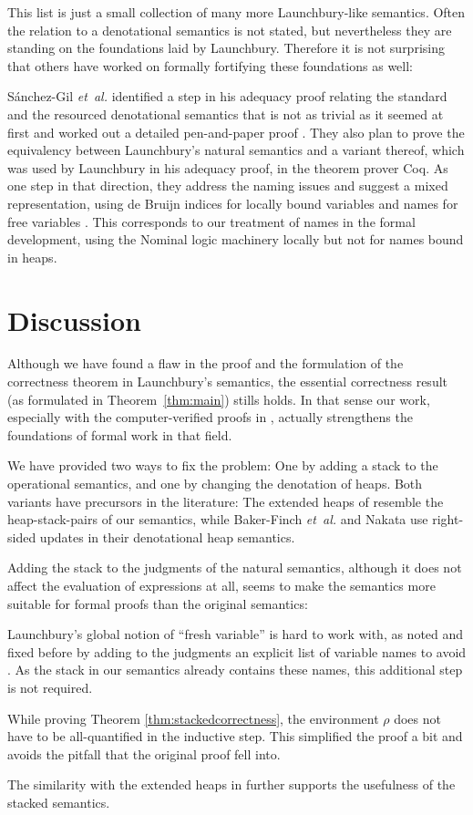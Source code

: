 \documentclass{jfp1}
\theoremstyle{nonumberbreak}
\begin{document}
This list is just a small collection of many more Launchbury-like semantics. Often the relation to a denotational semantics is not stated, but nevertheless they are standing on the foundations laid by Launchbury. Therefore it is not surprising that others have worked on formally fortifying these foundations as well:

S{\'a}nchez-Gil {\em et~al.} identified a step in his adequacy proof relating the standard and the resourced denotational semantics that is not as trivial as it seemed at first and worked out a detailed pen-and-paper proof . They also plan to prove the equivalency between Launchbury’s natural semantics and a variant thereof, which was used by Launchbury in his adequacy proof, in the theorem prover Coq. As one step in that direction, they address the naming issues and suggest a mixed representation, using de Bruijn indices for locally bound variables and names for free variables . This corresponds to our treatment of names in the formal development, using the Nominal logic machinery \cite{nominal} locally but not for names bound in heaps.

\section{Discussion}

Although we have found a flaw in the proof and the formulation of the correctness theorem in Launchbury’s semantics, the essential correctness result (as formulated in Theorem~\ref{thm:main}) stills holds. In that sense our work, especially with the computer-verified proofs in \cite{afp}, actually strengthens the foundations of formal work in that field.

We have provided two ways to fix the problem: One by adding a stack to the operational semantics, and one by changing the denotation of heaps. Both variants have precursors in the literature: The extended heaps of \cite{distributed} resemble the heap-stack-pairs of our semantics, while Baker-Finch {\em et~al.}  and Nakata  use right-sided updates in their denotational heap semantics.

Adding the stack to the judgments of the natural semantics, although it does not affect the evaluation of expressions at all, seems to make the semantics more suitable for formal proofs than the original semantics:
\begin{compactitem}
\item Launchbury’s global notion of “fresh variable” is hard to work with, as noted and fixed before by adding to the judgments an explicit list of variable names to avoid \cite{sestoft}. As the stack in our semantics already contains these names, this additional step is not required.
\item While proving Theorem \ref{thm:stackedcorrectness}, the environment $\rho$ does not have to be all-quantified in the inductive step. This simplified the proof a bit and avoids the pitfall that the original proof fell into.
\end{compactitem}
The similarity with the extended heaps in \cite{distributed} further supports the usefulness of the stacked semantics.
\end{document}
